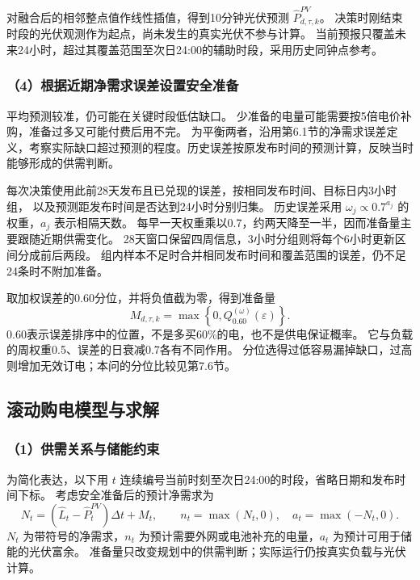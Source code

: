 对融合后的相邻整点值作线性插值，得到10分钟光伏预测 $\widehat P^{PV}_{d,\tau,k}$。
决策时刚结束时段的光伏观测作为起点，尚未发生的真实光伏不参与计算。
当前预报只覆盖未来24小时，超过其覆盖范围至次日24:00的辅助时段，采用历史同钟点参考。

\subsubsection*{（4）根据近期净需求误差设置安全准备}

平均预测较准，仍可能在关键时段低估缺口。
少准备的电量可能需要按5倍电价补购，准备过多又可能付费后用不完。
为平衡两者，沿用第6.1节的净需求误差定义，考察实际缺口超过预测的程度。历史误差按原发布时间的预测计算，反映当时能够形成的供需判断。

每次决策使用此前28天发布且已兑现的误差，按相同发布时间、目标日内3小时组，
以及预测距发布时间是否达到24小时分别归集。
历史误差采用 $\omega_j\propto0.7^{a_j}$ 的权重，$a_j$ 表示相隔天数。
每早一天权重乘以0.7，约两天降至一半，因而准备量主要跟随近期供需变化。
28天窗口保留四周信息，3小时分组则将每个6小时更新区间分成前后两段。
组内样本不足时合并相同发布时间和覆盖范围的误差，仍不足24条时不附加准备。

取加权误差的0.60分位，并将负值截为零，得到准备量
\begin{equation}
M_{d,\tau,k}=\max\left\{0,Q_{0.60}^{(\omega)}(\varepsilon)\right\}.
\end{equation}
0.60表示误差排序中的位置，不是多买60\%的电，也不是供电保证概率。
它与负载的周权重0.5、误差的日衰减0.7各有不同作用。
分位选得过低容易漏掉缺口，过高则增加无效订电；本问的分位比较见第7.6节。

\subsection{滚动购电模型与求解}

\subsubsection*{（1）供需关系与储能约束}

为简化表达，以下用 $t$ 连续编号当前时刻至次日24:00的时段，省略日期和发布时间下标。
考虑安全准备后的预计净需求为
\begin{equation}
N_t=(\widehat L_t-\widehat P^{PV}_t)\Delta t+M_t,\qquad
n_t=\max(N_t,0),\quad a_t=\max(-N_t,0).
\end{equation}
$N_t$ 为带符号的净需求，$n_t$ 为预计需要外网或电池补充的电量，$a_t$ 为预计可用于储能的光伏富余。
准备量只改变规划中的供需判断；实际运行仍按真实负载与光伏计算。

